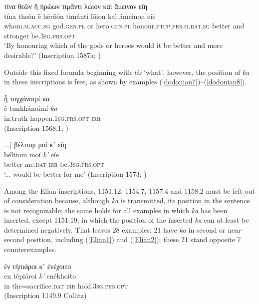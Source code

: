 \begin{exe}
\ex τίνα θεῶν ἢ ἡρώων τιμᾶντι λώιον καὶ ἄμεινον εἴη\\
\gll tína theôn ḕ hērṓōn timânti lṓion kaì ámeinon eíē\\
whom.\textsc{m.acc.sg} god.\textsc{gen.pl} or hero.\textsc{gen.pl}
honour.\textsc{ptcp.prs.m.dat.sg} better and stronger be.\textsc{3sg.prs.opt}\\
\trans `By honouring which of the gods or heroes would it be better and more desirable?' (Inscription 1587a; \citealp{Hoffmann1890})
\label{dodonian6}
\end{exe}

Outside this fixed formula beginning with \textit{tis} `what', however, the position of \textit{ka} in these inscriptions is free, as shown by examples (\ref{dodonian7})--(\ref{dodonian8}).

\begin{exe}
\ex ἦ τυγχάνοιμί κα\\
\gll ê tunkhánoimí \emph{ka}\\
in.truth happen.\textsc{1sg.prs.opt} \textsc{irr}\\
\trans (Inscription 1568.1; \citealp{Hoffmann1890})
\label{dodonian7}
\end{exe}

\begin{exe}
\ex {[}...{]} βέλτιομ μοί κ᾽ εἴη\\
\gll béltiom moí \emph{k'} eíē\\
better me.\textsc{dat} \textsc{irr} be.\textsc{3sg.prs.opt}\\
\trans `... would be better for me' (Inscription 1573; \citealp{Hoffmann1890})
\label{dodonian8}
\end{exe}

Among the Elian inscriptions, 1151.12, 1154.7, 1157.4 and 1158.2 must be left out of consideration because, although \textit{ka} is transmitted, its position in the sentence is not recognizable; the same holds for all examples in which \textit{ka} has been inserted, except 1151.19, in which the position of the inserted \textit{ka} can at least be determined negatively. That leaves 28 examples: 21 have \textit{ka} in second or near-second position, including (\ref{Elian1}) and (\ref{Elian2}); these 21 stand opposite 7 counterexamples.

\begin{exe}
\ex ἐν τἠπιάροι κ᾽ ἐνέχοιτο\\
\gll en tēpiároi \emph{k'} enékhoito\\
in the=sacrifice.\textsc{dat} \textsc{irr} hold.\textsc{3sg.prs.opt}\\
\trans (Inscription 1149.9 Collitz)
\label{Elian1}
\end{exe}

